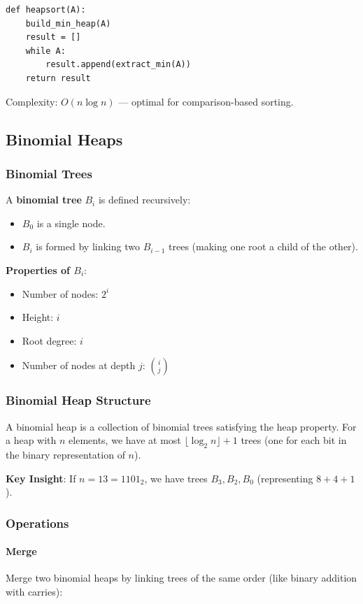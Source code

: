 \documentclass[11pt]{article}
\begin{document}
{{{\begin{lstlisting}
def heapsort(A):
    build_min_heap(A)
    result = []
    while A:
        result.append(extract_min(A))
    return result
\end{lstlisting}

Complexity: $O(n \log n)$ — optimal for comparison-based sorting.

\subsection*{Binomial Heaps}

\subsubsection*{Binomial Trees}
A \textbf{binomial tree} $B_i$ is defined recursively:
\begin{itemize}
\item $B_0$ is a single node.
\item $B_i$ is formed by linking two $B_{i-1}$ trees (making one root a child of the other).
\end{itemize}

\textbf{Properties of $B_i$}:
\begin{itemize}
\item Number of nodes: $2^i$
\item Height: $i$
\item Root degree: $i$
\item Number of nodes at depth $j$: $\binom{i}{j}$
\end{itemize}

\subsubsection*{Binomial Heap Structure}
A binomial heap is a collection of binomial trees satisfying the heap property. For a heap with $n$ elements, we have at most $\lfloor \log_2 n \rfloor + 1$ trees (one for each bit in the binary representation of $n$).

\textbf{Key Insight}: If $n = 13 = 1101_2$, we have trees $B_3, B_2, B_0$ (representing $8 + 4 + 1$).

\subsubsection*{Operations}

\paragraph{Merge}
Merge two binomial heaps by linking trees of the same order (like binary addition with carries):

}}}
\end{document}
